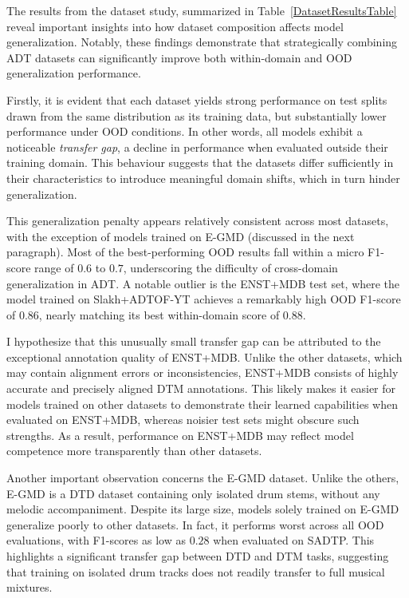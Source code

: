 The results from the dataset study, summarized in Table~\ref{DatasetResultsTable} reveal important insights into how dataset composition affects model generalization. Notably, these findings demonstrate that strategically combining \gls{ADT} datasets can significantly improve both within-domain and \acrfull{OOD} generalization performance.

Firstly, it is evident that each dataset yields strong performance on test splits drawn from the same distribution as its training data, but substantially lower performance under \gls{OOD} conditions. In other words, all models exhibit a noticeable \textit{transfer gap}, a decline in performance when evaluated outside their training domain. This behaviour suggests that the datasets differ sufficiently in their characteristics to introduce meaningful domain shifts, which in turn hinder generalization.

This generalization penalty appears relatively consistent across most datasets, with the exception of models trained on E-GMD (discussed in the next paragraph). Most of the best-performing \gls{OOD} results fall within a micro F1-score range of $0.6$ to $0.7$, underscoring the difficulty of cross-domain generalization in \gls{ADT}. A notable outlier is the ENST+MDB test set, where the model trained on Slakh+ADTOF-YT achieves a remarkably high \gls{OOD} F1-score of $0.86$, nearly matching its best within-domain score of $0.88$. 

I hypothesize that this unusually small transfer gap can be attributed to the exceptional annotation quality of ENST+MDB. Unlike the other datasets, which may contain alignment errors or inconsistencies, ENST+MDB consists of highly accurate and precisely aligned \gls{DTM} annotations. This likely makes it easier for models trained on other datasets to demonstrate their learned capabilities when evaluated on ENST+MDB, whereas noisier test sets might obscure such strengths. As a result, performance on ENST+MDB may reflect model competence more transparently than other datasets.

Another important observation concerns the E-GMD dataset. Unlike the others, E-GMD is a \acrfull{DTD} dataset containing only isolated drum stems, without any melodic accompaniment. Despite its large size, models solely trained on E-GMD generalize poorly to other datasets. In fact, it performs worst across all \gls{OOD} evaluations, with F1-scores as low as $0.28$ when evaluated on SADTP. This highlights a significant transfer gap between \gls{DTD} and \gls{DTM} tasks, suggesting that training on isolated drum tracks does not readily transfer to full musical mixtures. 


